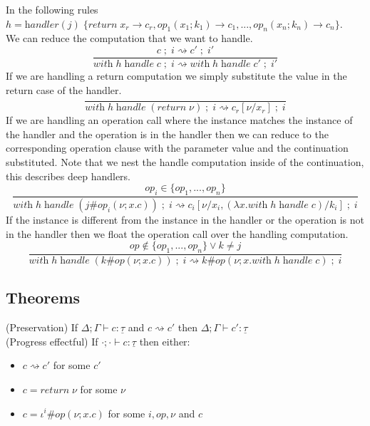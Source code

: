 \documentclass[12pt]{article}
\newcommand\op[0]{op}
\newcommand\ty[0]{\tau}
\newcommand\cty[0]{\underline{\ty}}
\newcommand\val[0]{\nu}
\newcommand\vabs[2]{\lambda #1 . #2}
\newcommand\vhandleri[2]{\textit{handler} ( #1 ) \; \{#2\}}
\newcommand\comp[0]{c}
\newcommand\creturn[1]{\textit{return} \; #1}
\newcommand\copi[5]{#1 \# #2(#3 ; #4 . #5)}
\newcommand\chandle[2]{\textit{with} \; #1 \; \textit{handle} \; #2}
\newcommand\sep[0]{\;;\;}
\begin{document}
In the following rules \\$h = 
	\vhandleri{j}{
		\textit{return} \; x_r \rightarrow \comp_r,
		\op_1(x_1 ; k_1) \rightarrow \comp_1,
		...,
		\op_n(x_n ; k_n) \rightarrow \comp_n
	}$.\\
We can reduce the computation that we want to handle.\\
\[\frac{
	\comp\sep i \rightsquigarrow \comp'\sep i'
}{
	\chandle{h}{\comp}\sep i \rightsquigarrow \chandle{h}{\comp'}\sep i'
}\]
If we are handling a return computation we simply substitute the value in the return case of the handler.\\
\[\frac{
}{
\chandle{h}{(\creturn{\val})}\sep i \rightsquigarrow \comp_r[\val/x_r]\sep i
}\]
If we are handling an operation call where the instance matches the instance of the handler and the operation is in the handler then we can reduce to the corresponding operation clause with the parameter value and the continuation substituted.
Note that we nest the handle computation inside of the continuation, this describes deep handlers.\\
\[\frac{
	\op_i \in \{\op_1, ..., \op_n \}
}{
	\chandle{h}{(\copi{j}{\op_i}{\val}{x}{\comp})}\sep i \rightsquigarrow \comp_i[\val/x_i, (\vabs{x}{\chandle{h}{\comp}})/k_i]\sep i
}\]
If the instance is different from the instance in the handler or the operation is not in the handler then we float the operation
call over the handling computation.\\
\[\frac{
	\op \notin \{\op_1, ..., \op_n \} \lor k \neq j
}{
	\chandle{h}{(\copi{k}{\op}{\val}{x}{\comp})}\sep i \rightsquigarrow \copi{k}{\op}{\val}{x}{\chandle{h}{\comp}}\sep i
}\]

\subsection{Theorems}

(Preservation) If $\Delta;\Gamma \vdash \comp : \cty$ and $\comp \rightsquigarrow \comp'$ then $\Delta;\Gamma \vdash \comp' : \cty$ \\

(Progress effectful) If $\cdot;\cdot \vdash \comp : \cty$ then either:
\begin{itemize}
\item $\comp \rightsquigarrow \comp'$ for some $\comp'$
\item $\comp = \creturn{\val}$ for some $\val$
\item $\comp = \copi{\iota^i}{\op}{\val}{x}{\comp}$ for some $i, \op, \val$ and $\comp$
\end{itemize}
\end{document}
